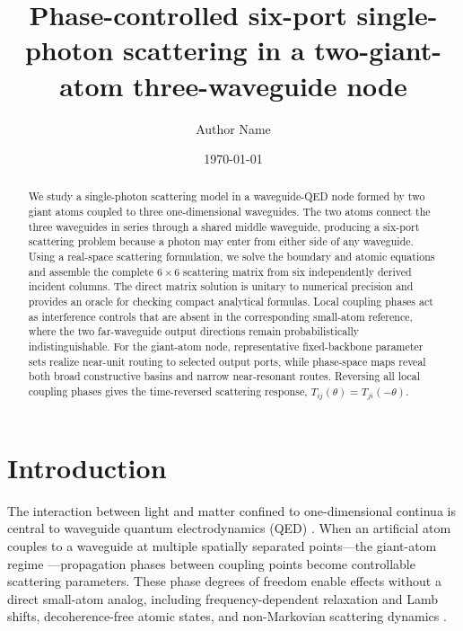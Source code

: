 \documentclass[aps,pra,reprint,superscriptaddress,nofootinbib,longbibliography,floatfix]{revtex4-2}
\begin{document}
\title{Phase-controlled six-port single-photon scattering in a two-giant-atom three-waveguide node}

\author{Author Name}

\date{\today}

\begin{abstract}
We study a single-photon scattering model in a waveguide-QED node formed by two giant atoms coupled to three one-dimensional waveguides.
The two atoms connect the three waveguides in series through a shared middle waveguide, producing a six-port scattering problem because a photon may enter from either side of any waveguide.
Using a real-space scattering formulation, we solve the boundary and atomic equations and assemble the complete $6\times6$ scattering matrix from six independently derived incident columns.
The direct matrix solution is unitary to numerical precision and provides an oracle for checking compact analytical formulas.
Local coupling phases act as interference controls that are absent in the corresponding small-atom reference, where the two far-waveguide output directions remain probabilistically indistinguishable.
For the giant-atom node, representative fixed-backbone parameter sets realize near-unit routing to selected output ports, while phase-space maps reveal both broad constructive basins and narrow near-resonant routes.
Reversing all local coupling phases gives the time-reversed scattering response, $T_{ij}(\theta)=T_{ji}(-\theta)$.
\end{abstract}

\maketitle

\section{Introduction}

The interaction between light and matter confined to one-dimensional continua is central to waveguide quantum electrodynamics (QED) \cite{Roy2017Colloquium,Gu2017MicrowavePhotonics}.
When an artificial atom couples to a waveguide at multiple spatially separated points---the giant-atom regime \cite{Kockum2014Designing,Kockum2018GiantAtoms}---propagation phases between coupling points become controllable scattering parameters.
These phase degrees of freedom enable effects without a direct small-atom analog, including frequency-dependent relaxation and Lamb shifts, decoherence-free atomic states, and non-Markovian scattering dynamics \cite{Kockum2018GiantAtomsReview,Kannan2020GiantAtom}.
\end{document}
